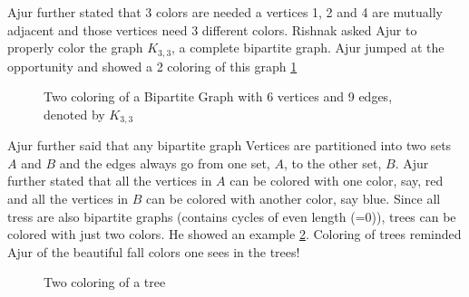 Ajur further stated that 3 colors are needed a vertices 1, 2 and 4 are mutually adjacent and those vertices need 3 different colors. 
Rishnak asked Ajur to properly color the graph $K_{3,3}$, a complete bipartite graph. Ajur jumped at the opportunity and showed a 2 coloring of this graph \ref{10g3}
\begin{figure}
\begin{center}
\caption{ Two coloring of a Bipartite Graph with 6 vertices and 9 edges, denoted by $K_{3,3}$}\label{10g3}
\end{center}
\end{figure}

Ajur further said that any bipartite graph Vertices are partitioned into two sets $A$ and $B$ and the edges always go from one set, $A$, to the other set, $B$. Ajur further stated that all the vertices in $A$ can be colored with one color, say, red and all the vertices in $B$ can be colored with another color, say blue. Since all tress are also bipartite graphs (contains cycles of even length (=0)), trees can be colored with just two colors. He showed an example \ref{10g4}. Coloring of trees reminded Ajur of the beautiful fall colors one sees in the trees!
\begin{figure}
\begin{center}


\caption{Two coloring of a tree }\label{10g4}
\end{center}
\end{figure}

